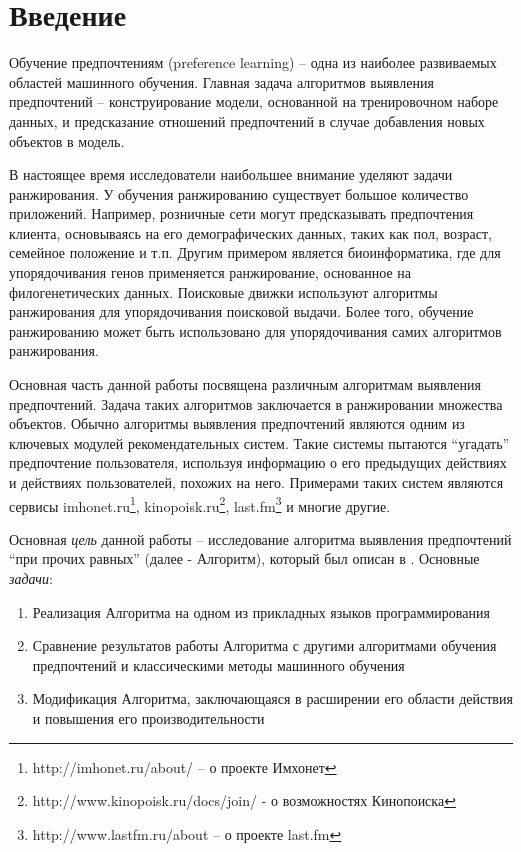 \chapter*{Введение}

Обучение предпочтениям (preference learning) – одна из наиболее развиваемых областей машинного обучения. Главная задача алгоритмов выявления предпочтений – конструирование модели, основанной на тренировочном наборе данных, и предсказание отношений предпочтений в случае добавления новых объектов в модель.

В настоящее время исследователи наибольшее внимание уделяют задачи ранжирования. У обучения ранжированию существует большое количество приложений. Например, розничные сети могут предсказывать предпочтения клиента, основываясь на его демографических данных, таких как пол, возраст, семейное положение и т.п. Другим примером является биоинформатика, где для упорядочивания генов применяется ранжирование, основанное на филогенетических данных. \cite{Balasubramaniyan:2005} Поисковые движки используют алгоритмы ранжирования для упорядочивания поисковой выдачи. Более того, обучение ранжированию может быть использовано для упорядочивания самих алгоритмов ранжирования\cite{Brazdil:2003}.

Основная часть данной работы посвящена различным алгоритмам выявления предпочтений. Задача таких алгоритмов заключается в ранжировании множества объектов. Обычно алгоритмы выявления предпочтений являются одним из ключевых модулей рекомендательных систем. Такие системы пытаются \enquote{угадать} предпочтение пользователя, используя информацию о его предыдущих действиях и действиях пользователей, похожих на него. Примерами таких систем являются сервисы imhonet.ru\footnote{http://imhonet.ru/about/ – о проекте Имхонет}, kinopoisk.ru\footnote{http://www.kinopoisk.ru/docs/join/ - о возможностях Кинопоиска}, last.fm\footnote{http://www.lastfm.ru/about – о проекте last.fm} и многие другие.

Основная \emph{цель} данной работы – исследование алгоритма выявления предпочтений \enquote{при прочих равных} (далее - Алгоритм), который был описан в \cite{Obiedkov:2013}. Основные \emph{задачи}:
\begin{enumerate} 
	\item Реализация Алгоритма на одном из прикладных языков программирования
	\item Сравнение результатов работы Алгоритма с другими алгоритмами обучения предпочтений и классическими методы машинного обучения
	\item Модификация Алгоритма, заключающаяся в расширении его области действия и повышения его производительности
\end{enumerate}

